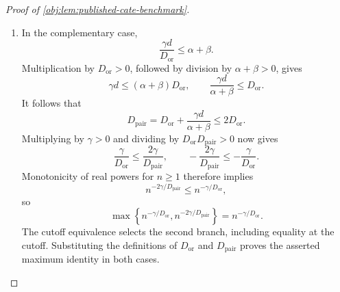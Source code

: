 \begin{proof}[Proof of \cref{obj:lem:published-cate-benchmark}]
\begin{enumerate}
\item In the complementary case,
\[
\frac{\gamma d}{D_{\mathrm{or}}}\le\alpha+\beta.
\]
Multiplication by \(D_{\mathrm{or}}>0\), followed by division by
\(\alpha+\beta>0\), gives
\[
\gamma d\le(\alpha+\beta)D_{\mathrm{or}},
\qquad
\frac{\gamma d}{\alpha+\beta}\le D_{\mathrm{or}}.
\]
It follows that
\[
D_{\mathrm{pair}}
=D_{\mathrm{or}}+\frac{\gamma d}{\alpha+\beta}
\le2D_{\mathrm{or}}.
\]
Multiplying by \(\gamma>0\) and dividing by
\(D_{\mathrm{or}}D_{\mathrm{pair}}>0\) now gives
\[
\frac{\gamma}{D_{\mathrm{or}}}
\le\frac{2\gamma}{D_{\mathrm{pair}}},
\qquad
-\frac{2\gamma}{D_{\mathrm{pair}}}
\le-\frac{\gamma}{D_{\mathrm{or}}}.
\]
Monotonicity of real powers for \(n\ge1\) therefore implies
\[
n^{-2\gamma/D_{\mathrm{pair}}}
\le n^{-\gamma/D_{\mathrm{or}}},
\]
so
\[
\max\left\{
n^{-\gamma/D_{\mathrm{or}}},
n^{-2\gamma/D_{\mathrm{pair}}}
\right\}
=n^{-\gamma/D_{\mathrm{or}}}.
\]
The cutoff equivalence selects the second branch, including equality at the cutoff. Substituting the definitions of \(D_{\mathrm{or}}\) and \(D_{\mathrm{pair}}\) proves the asserted maximum identity in both cases.
\end{enumerate}
\end{proof}
